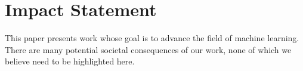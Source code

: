 \documentclass{article}
\theoremstyle{plain}
\theoremstyle{definition}
\theoremstyle{remark}
\begin{document}

\newcommand*\jason[1]{{\textcolor{orange}{Juncheng: #1}}}
\newcommand*\murphy[1]{{\textcolor{blue}{Murphy: #1}}}
\newcommand*\yiyan[1]{{\textcolor{teal}{Yiyan: #1}}}


\printAffiliationsAndNotice{\icmlEqualContribution} %













\section*{Impact Statement}
This paper presents work whose goal is to advance the field of machine learning. There are many potential societal consequences of our work, none of which we believe need to be highlighted here.
\end{document}
